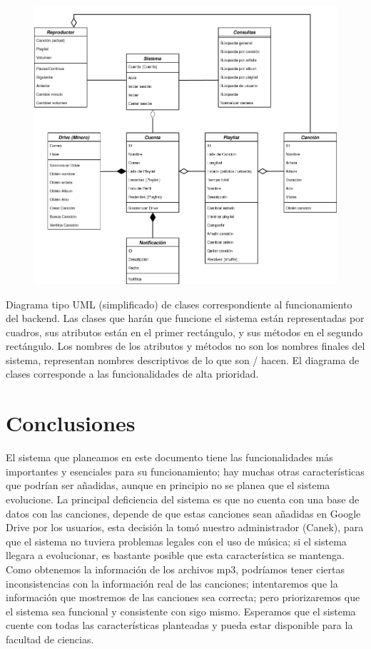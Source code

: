 \documentclass[12pt]{article}
\newcounter{ni}
\begin{document}
\begin{figure}[H]
\centering
\includegraphics[width=16cm]{Diagrama de Clase Backend.png}
\end{figure}

Diagrama tipo UML (simplificado) de clases correspondiente al funcionamiento del backend. Las clases que harán que funcione el sistema están representadas por cuadros, sus atributos están en el primer rectángulo, y sus métodos en el segundo rectángulo.
Los nombres de los atributos y métodos no son los nombres finales del sistema, representan nombres descriptivos de lo que son / hacen.
El diagrama de clases corresponde a las funcionalidades de alta prioridad.


\section{Conclusiones}

El sistema que planeamos en este documento tiene las funcionalidades más importantes y esenciales para su funcionamiento; hay muchas otras características que podrían ser añadidas, aunque en principio no se planea que el sistema evolucione.
La principal deficiencia del sistema es que no cuenta con una base de datos con las canciones, depende de que estas canciones sean añadidas en Google Drive por los usuarios, esta decisión la tomó nuestro administrador (Canek), para que el sistema no tuviera problemas legales con el uso de música; si el sistema llegara a evolucionar, es bastante posible que esta característica se mantenga.
Como obtenemos la información de los archivos mp3, podríamos tener ciertas inconsistencias con la información real de las canciones; intentaremos que la información que mostremos de las canciones sea correcta; pero priorizaremos que el sistema sea funcional y consistente con sigo mismo.
Esperamos que el sistema cuente con todas las características planteadas y pueda estar disponible para la facultad de ciencias.
\end{document}
